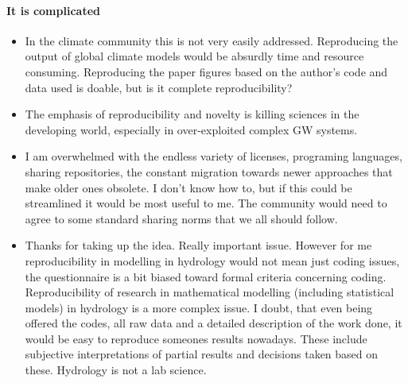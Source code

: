 \documentclass{article}
\begin{document}
\paragraph{It is complicated}
\begin{itemize}
	\item In the climate community this is not very easily addressed. Reproducing the output of global climate models would be absurdly time and resource consuming. Reproducing the paper figures based on the author's code and data used is doable, but is it complete reproducibility?
	\item The emphasis of reproducibility and novelty is killing sciences in the developing world, especially in over-exploited complex GW systems.
	\item I am overwhelmed with the endless variety of licenses, programing languages, sharing repositories, the constant migration towards newer approaches that make older ones obsolete. I don't know how to, but if this could be streamlined it would be most useful to me. The community would need to agree to some standard sharing norms that we all should follow.
	\item Thanks for taking up the idea. Really important  issue. However for me reproducibility in modelling in hydrology would not mean just coding issues, the questionnaire is a bit biased toward formal criteria concerning coding. Reproducibility of research in mathematical modelling (including statistical models) in   hydrology is a  more complex issue.  I doubt, that even being offered the codes, all raw data and a detailed  description of the work done, it would be easy to reproduce someones results nowadays. These include subjective interpretations  of partial results and decisions taken based on these. Hydrology is not a lab science.

\end{itemize}
\end{document}
